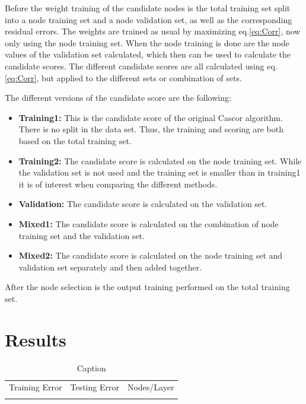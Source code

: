 \documentclass[a4paper,11pt, usenatbib]{article}
\begin{document}
Before the weight training of the candidate nodes is the total training set split into a node training set and a node validation set, as well as the corresponding residual errors. The weights are trained as usual by maximizing eq.\eqref{eq:Corr}, now only using the node training set. When the node training is done are the node values of the validation set calculated, which then can be used to calculate the candidate scores. The different candidate scores are all calculated using eq.\eqref{eq:Corr}, but applied to the different sets or combination of sets. 

The different versions of the candidate score are the following:
\begin{itemize}
    \item \textbf{Training1:} This is the candidate score of the original Cascor algorithm. There is no split in the data set. Thus, the training and scoring are both based on the total training set.
    \item \textbf{Training2:} The candidate score is calculated on the node training set. While the validation set is not used and the training set is smaller than in training1 it is of interest when comparing the different methods.
    \item \textbf{Validation:} The candidate score is calculated on the validation set.
    \item \textbf{Mixed1:} The candidate score is calculated on the combination of node training set and the validation set. 
    \item \textbf{Mixed2:} The candidate score is calculated on the node training set and validation set separately and then added together. 
\end{itemize}

After the node selection is the output training performed on the total training set. 


\section{Results}
\begin{table}[]
    \centering
    \caption{Caption}
    \begin{tabular}{|c|c|c|}
        Training Error & Testing Error & Nodes/Layer \\
         & 
    \end{tabular}
    \label{tab:results}
\end{table}{}
\setcounter{equation}{0}
\end{document}
